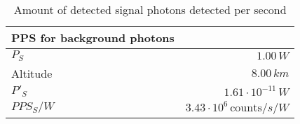 \begin{table}[H]
\centering
\caption{Amount of detected signal photons detected per second}
\label{tab:PPS_S}
\begin{tabular}{|l|r|}\hline
    \textbf{PPS for background photons} & \\
    \hline 
    $P_S$ & $1.00\,W$ \\
    Altitude & $8.00\, km$ \\
    $P'_S$ & $1.61\cdot10^{-11}\,W$ \\
    $PPS_S/W$ & $3.43\cdot10^{6}\,\text{counts}/s/W$ \\
    \hline 
\end{tabular}
\end{table}

